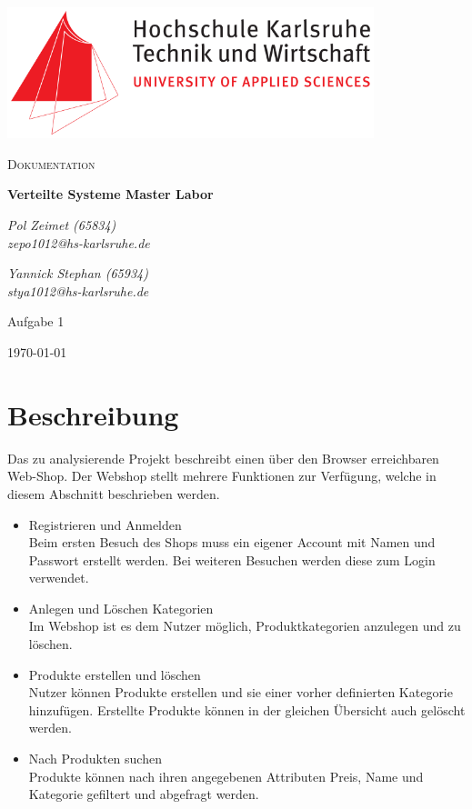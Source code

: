 \documentclass[12pt,a4paper]{article}
\begin{document}
	\begin{titlepage}
		\centering
		\includegraphics[width=0.8\textwidth]{img/Hska_logo.png}\par\vspace{1cm}
		{\scshape\LARGE Dokumentation\par}
		\vspace{1.5cm}
		{\huge\bfseries Verteilte Systeme Master Labor\par}
		\vspace{2cm}
		{\Large\itshape Pol Zeimet (65834) \\zepo1012@hs-karlsruhe.de\par}
		\vfill
		{\Large\itshape Yannick Stephan (65934) \\stya1012@hs-karlsruhe.de\par}
		\vfill
		\large Aufgabe 1
		
		\vfill
		
		{\large \today\par}
	\end{titlepage}
	\section{Beschreibung}
	\label{sec:Beschreibung}
	Das zu analysierende Projekt beschreibt einen über den Browser erreichbaren Web-Shop. Der Webshop stellt mehrere Funktionen zur Verfügung, welche in diesem Abschnitt beschrieben werden.
	\begin{itemize}
	\item{Registrieren und Anmelden}\\ Beim ersten Besuch des Shops muss ein eigener Account mit Namen und Passwort erstellt werden. Bei weiteren Besuchen werden diese zum Login verwendet.
	\item{Anlegen und Löschen Kategorien}\\ Im Webshop ist es dem Nutzer möglich, Produktkategorien anzulegen und zu löschen.
	\item{Produkte erstellen und löschen}\\ Nutzer können Produkte erstellen und sie einer vorher definierten Kategorie hinzufügen. Erstellte Produkte können in der gleichen Übersicht auch gelöscht werden.
	\item{Nach Produkten suchen}\\ Produkte können nach ihren angegebenen Attributen  Preis, Name und Kategorie gefiltert und abgefragt werden.
	\end{itemize}
\end{document}
